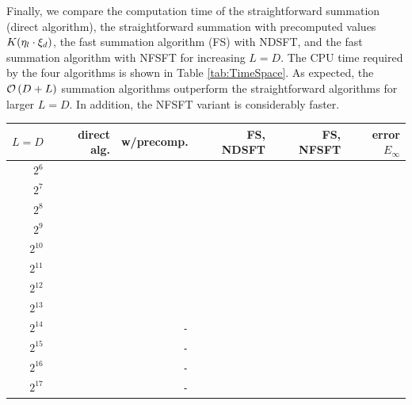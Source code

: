 Finally, we compare the computation time of the straightforward summation 
(direct algorithm), the straightforward summation with precomputed values 
$K{\hspace{-0.4ex}}\left(\mathbf{\eta}_{l} \cdot \mathbf{\xi}_{d}\right)$, the fast summation algorithm (FS) 
with NDSFT, and the fast summation algorithm with NFSFT for increasing $L=D$.
The CPU time required by the four algorithms is shown in Table 
\ref{tab:TimeSpace}. As expected, the $\mathcal{O}\left(D + L\right)$ summation algorithms outperform the
straightforward algorithms for larger $L=D$. In addition, the NFSFT variant is 
considerably faster.

\begin{table}[h]
  \begin{center}
    \begin{tabular}{r|r|r|r|r|r}
        $L = D$ & direct alg. & w/precomp. & FS, NDSFT & FS, NFSFT & error $E_{\infty}$\\\hline
           $2^6$ & \verb#1.0E-05# & \verb#8.0E-05# & \verb#1.1E-01# & \verb#6.2E-01# & \verb#7.7E-14# \\
           $2^7$ & \verb#6.0E-05# & \verb#3.8E-04# & \verb#2.2E-01# & \verb#6.2E-01# & \verb#6.5E-14# \\
           $2^8$ & \verb#2.5E-04# & \verb#1.4E-03# & \verb#4.5E-01# & \verb#6.2E-01# & \verb#4.1E-14# \\
           $2^9$ & \verb#1.0E-03# & \verb#5.3E-03# & \verb#8.9E-01# & \verb#6.3E-01# & \verb#2.8E-14# \\
        $2^{10}$ & \verb#4.0E-02# & \verb#2.1E-02# & \verb#1.8E+00# & \verb#6.5E-01# & \verb#3.6E-14# \\
        $2^{11}$ & \verb#1.6E+00# & \verb#8.3E-02# & \verb#3.6E+00# & \verb#6.6E-01# & \verb#1.8E-14# \\
        $2^{12}$ & \verb#6.4E+00# & \verb#3.5E-01# & \verb#7.1E+00# & \verb#7.2E-01# & \verb#1.3E-14# \\
        $2^{13}$ & \verb#2.6E+01# & \verb#1.4E+00# & \verb#1.4E+01# & \verb#8.2E-01# & \verb#6.7E-15# \\
        $2^{14}$ & \verb#1.0E+02# & \verb#-#       & \verb#2.8E+01# & \verb#1.0E+00# & \verb#5.5E-15# \\
        $2^{15}$ & \verb#4.1E+02# & \verb#-#       & \verb#5.7E+01# & \verb#1.5E+00# & \verb#4.0E-15# \\
        $2^{16}$ & \verb#1.6E+03# & \verb#-#       & \verb#1.1E+02# & \verb#2.3E+00# & \verb#2.9E-15# \\
        $2^{17}$ & \verb#6.6E+03# & \verb#-#       & \verb#2.3E+02# & \verb#4.0E+00# & \verb#2.4E-15# \\

\end{tabular}
\end{center}
\end{table}

